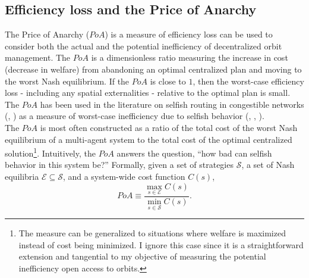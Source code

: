 \documentclass[12pt]{article}
\begin{document}
\subsection{Efficiency loss and the Price of Anarchy}

The Price of Anarchy ($PoA$) is a measure of efficiency loss can be used to consider both the actual and the potential inefficiency of decentralized orbit management. The $PoA$ is a dimensionless ratio measuring the increase in cost (decrease in welfare) from abandoning an optimal centralized plan and moving to the worst Nash equilibrium. If the $PoA$ is close to $1$, then the worst-case efficiency loss - including any spatial externalities - relative to the optimal plan is small. The $PoA$ has been used in the literature on selfish routing in congestible networks (\cite{robinson2004}, \cite{poaFirst}) as a measure of worst-case inefficiency due to selfish behavior (\cite{roughgarden2005selfish}, \cite{gairingetal2006}, \cite{roughgarden2009}).\\ %

The $PoA$ is most often constructed as a ratio of the total cost of the worst Nash equilibrium of a multi-agent system to the total cost of the optimal centralized solution\footnote{The measure can be generalized to situations where welfare is maximized instead of cost being minimized. I ignore this case since it is a straightforward extension and tangential to my objective of measuring the potential inefficiency open access to orbits.}. Intuitively, the $PoA$ answers the question, ``how bad can selfish behavior in this system be?'' Formally, given a set of strategies $\mathcal{S}$, a set of Nash equilibria $\mathcal{E} \subseteq \mathcal{S}$, and a system-wide cost function $C(s)$,
\[ PoA \equiv \frac{\max_{s\in \mathcal{E}} C(s) }{ \min_{s \in \mathcal{S}} C(s)}. \]

\end{document}
